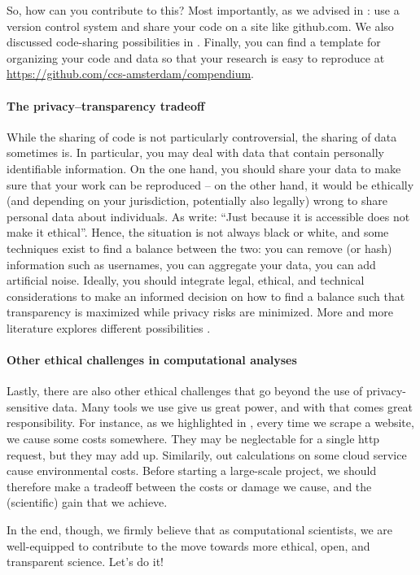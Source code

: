 So, how can you contribute to this? Most importantly, as we advised in : use a version control system
and share your code on a site like github.com. We also discussed code-sharing possibilities in . Finally, you can find a template for organizing your code and data so that your
research is easy to reproduce at \url{https://github.com/ccs-amsterdam/compendium}. 

\paragraph{The privacy--transparency tradeoff} While the sharing of code is not particularly controversial, the sharing of
data sometimes is. In particular, you may deal with data that contain personally identifiable information. On the one
hand, you should share your data to make sure that your work can be reproduced -- on the other hand, it would be ethically
(and depending on your jurisdiction, potentially also legally) wrong to share personal data about individuals.
As \cite{boyd2012} write: ``Just because it is accessible does not make it ethical''. Hence, the
situation is not always black or white, and some techniques exist to find a balance between the two: you can remove
(or hash) information such as usernames, you can aggregate your data, you can add artificial noise. Ideally, you should
integrate legal, ethical, and technical considerations to make an informed decision on how to find a balance such that
transparency is maximized while privacy risks are minimized. More and more literature explores different possibilities \cite[e.g.][]{Breuer2020}.


\paragraph{Other ethical challenges in computational analyses} 
Lastly, there are also other ethical challenges that go beyond the use of privacy-sensitive data. Many tools we
use give us great power, and with that comes great responsibility. For instance, as we highlighted in
, every time we scrape a website, we cause some costs somewhere. They may be
neglectable for a single http request, but they may add up. Similarily, out calculations on some cloud service
cause environmental costs. Before starting a large-scale project, we should therefore make a tradeoff between
the costs or damage we cause, and the (scientific) gain that we achieve.

In the end, though, we firmly believe that as computational scientists, we are well-equipped to contribute to the move towards
more ethical, open, and transparent science. Let's do it!
